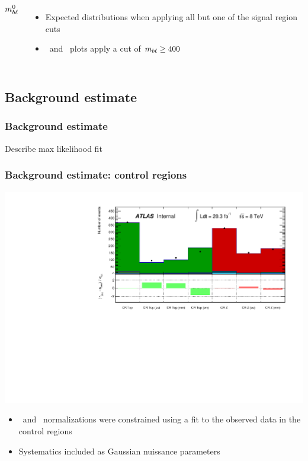 \documentclass[10pt, svgnames]{beamer}
\begin{document}
\begin{frame}[t]
\begin{columns}[t]
\begin{block}{$m_{b\ell}^0$}
    \end{block}
    \begin{itemize}
      \item Expected distributions when applying all but one of the signal
        region cuts
      \item \HT\ and \MBLASYM\ plots apply a cut of $m_{b\ell} \ge 400$
    \end{itemize}
  \end{columns}
\end{frame}



\subsection{Background estimate}

\begin{frame}[t]
  \frametitle{Background estimate}
  \UpdateFlag
  Describe max likelihood fit
\end{frame}


\begin{frame}
  \frametitle{Background estimate: control regions}
  \includegraphics[width=\textwidth]{figures/histpull_CR_detailed.pdf}
  \begin{itemize}
    \item \TTBAR\ and \ZGAMMA\ normalizations were constrained using a fit to
      the observed data in the control regions
    \item Systematics included as Gaussian nuissance parameters
  \end{itemize}
\end{frame}
\end{document}
